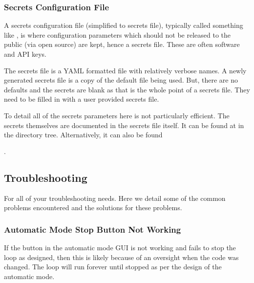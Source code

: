 \documentclass[letterpaper,11pt,english]{sphinxmanual}
\begin{document}
\subsubsection{Secrets Configuration File}
\label{\detokenize{user/configuration:secrets-configuration-file}}\label{\detokenize{user/configuration:user-configuration-secrets-configuration-file}}
\sphinxAtStartPar
A secrets configuration file (simplified to secrets file), typically
called something like , is where configuration parameters
which should not be released to the public (via open source) are kept, hence a
secrets file. These are often software and API keys.

\sphinxAtStartPar
The secrets file is a YAML formatted file with relatively verbose names.
A newly generated secrets file is a copy of the default file being used. But,
there are no defaults and the secrets are blank as that is the whole point of
a secrets file. They need to be filled in with a user provided secrets file.

\sphinxAtStartPar
To detail all of the secrets parameters here is not particularly efficient.
The secrets themselves are documented in the secrets file itself. It can be
found at  in the directory tree.
Alternatively, it can also be found %
\begin{footnote}[10]\sphinxAtStartFootnote
{}
%
\end{footnote}.

\sphinxstepscope


\subsection{Troubleshooting}
\label{\detokenize{user/troubleshooting:troubleshooting}}\label{\detokenize{user/troubleshooting:user-troubleshooting}}\label{\detokenize{user/troubleshooting::doc}}
\sphinxAtStartPar
For all of your troubleshooting needs. Here we detail some of the common
problems encountered and the solutions for these problems.


\subsubsection{Automatic Mode Stop Button Not Working}
\label{\detokenize{user/troubleshooting:automatic-mode-stop-button-not-working}}\label{\detokenize{user/troubleshooting:user-troubleshooting-automatic-mode-stop-button-not-working}}
\sphinxAtStartPar
If the  button in the automatic mode GUI is not working and
fails to stop the loop as designed, then this is likely because of an oversight
when the code was changed. The loop will run forever until stopped as per the
design of the automatic mode.
\end{document}
